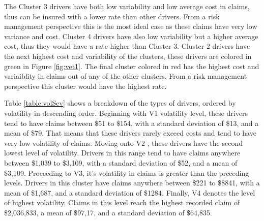 \documentclass[11pt,letterpaper]{article}
\numberwithin{equation}{section}
\numberwithin{equation}{section}
\numberwithin{equation}{section}
\begin{document}
 The Cluster 3 drivers have both low variability and low average cost in claims, thus can be insured with a lower rate than other drivers. From a risk management perspective this is the most ideal case as these claims have very low variance and cost. Cluster 4 drivers have also low variability but a higher average cost, thus they would have a rate higher than Cluster 3. Cluster 2 drivers have the next highest cost and variability of the clusters, these drivers are colored in green in Figure \ref{fig:vet1}. The final cluster colored in red has the highest cost and variaiblity in claims out of any of the other clusters. From a risk management perspective this cluster would have the highest rate.
\begin{table}[!htb]
\centering
\caption{Summarized volatility information of each cluster for Claims.}
\label{table:volSev}
\end{table}



Table \ref{table:volSev} shows a breakdown of the types of drivers, ordered by volatility in descending order. Beginning with V1 volatility level, these drivers tend to have claims between \$51 to \$154, with a standard deviation of \$13, and a mean of \$79. That means that these drivers rarely exceed costs and tend to have very low volatility of claims. Moving onto V2 , these drivers have the second lowest level of volatility. Drivers in this range tend to have claims anywhere between \$1,039 to \$3,109, with a standard deviation of \$52, and a mean of \$3,109.  Proceeding to V3, it's volatility in claims is greater than the preceding levels. Drivers in this cluster have claims anywhere between \$221 to \$8841, with a mean of \$1,687, and a standard deviation of \$1284. Finally, V4 denotes the level of highest volatility. Claims in this level  reach the highest recorded claim of \$2,036,833, a mean of \$97,17, and a standard deviation of \$64,835.
\end{document}
